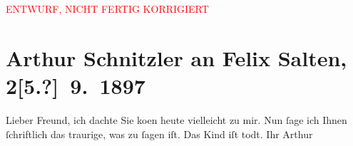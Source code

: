 
\begin{center}
            \textcolor{red}{ENTWURF, NICHT FERTIG KORRIGIERT}
                      \end{center}
            
         
         \renewcommand{\erwaehntePersonen}{Personen:  ?? [Totgeborener Sohn von Arthur Schnitzler und Marie Reinhard], Felix Salten}
         \renewcommand{\erwaehnteOrte}{Orte: Wien}
         \renewcommand{\erwaehnteWerke}{}
               \section[Arthur Schnitzler an Felix Salten, 2{[}5.?{]} 9. 1897]{ Arthur Schnitzler an Felix Salten, 2{[}5.?{]} 9. 1897}\nopagebreak{}\rehead{ }\begin{ledgroupsized}[t]{13cm}\normalsize\beginnumbering \toendnotes[C]{\smallbreak\pagebreak[2]} 
\toendnotes[C]{\smallbreak}\pstart
           \noindent{}{\pb}Lieber Freund,\pend
           \pstart
           ich dachte Sie ko{\geminationm}en heute vielleicht zu mir. Nun ſage
               ich Ihnen ſchriftlich das traurige, was zu ſagen iſt. Das Kind iſt todt. \pend
           \pstart Ihr \spacefill\mbox{Arthur}\pend{}
         
         \endnumbering{}\end{ledgroupsized}\begin{anhang}\end{anhang}\newcommand{\dateiname}{L02965}\newcommand{\titel}{Arthur Schnitzler an Felix Salten, 2[5.?] 9. 1897}\newcommand{\editorInnen}{Martin Anton Müller und Laura Untner}
      